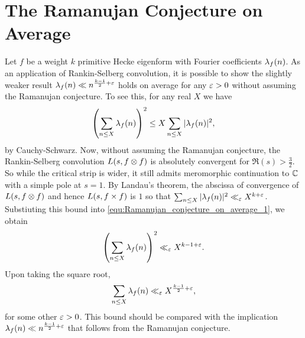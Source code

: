     \section{The Ramanujan Conjecture on Average}
      Let $f$ be a weight $k$ primitive Hecke eigenform with Fourier coefficients $\lambda_{f}(n)$. As an application of Rankin-Selberg convolution, it is possible to show the slightly weaker result $\lambda_{f}(n) \ll n^{\frac{k-1}{2}+\varepsilon}$ holds on average for any $\varepsilon > 0$ without assuming the Ramanujan conjecture. To see this, for any real $X$ we have
      \begin{equation}\label{equ:Ramanujan_conjecture_on_average_1}
        \left(\sum_{n \le X}\lambda_{f}(n)\right)^{2} \le X\sum_{n \le X}|\lambda_{f}(n)|^{2},
      \end{equation}
      by Cauchy-Schwarz. Now, without assuming the Ramanujan conjecture, the Rankin-Selberg convolution $L(s,f \otimes f)$ is absolutely convergent for $\Re(s) > \frac{3}{2}$. So while the critical strip is wider, it still admits meromorphic continuation to $\mathbb{C}$ with a simple pole at $s = 1$. By Landau's theorem, the abscissa of convergence of $L(s,f \otimes f)$ and hence $L(s,f \times f)$ is $1$ so that $\sum_{n \le X}|\lambda_{f}(n)|^{2} \ll_{\varepsilon} X^{k+\varepsilon}$. Substiuting this bound into \cref{equ:Ramanujan_conjecture_on_average_1}, we obtain
      \[
        \left(\sum_{n \le X}\lambda_{f}(n)\right)^{2} \ll_{\varepsilon} X^{k-1+\varepsilon}.
      \]
      Upon taking the square root,
      \[
        \sum_{n \le X}\lambda_{f}(n) \ll_{\varepsilon} X^{\frac{k-1}{2}+\varepsilon},
      \]
      for some other $\varepsilon > 0$. This bound should be compared with the implication $\lambda_{f}(n) \ll n^{\frac{k-1}{2}+\varepsilon}$ that follows from the Ramanujan conjecture.